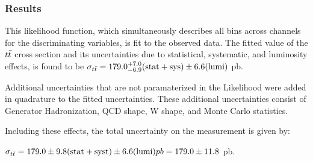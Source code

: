 \subsubsection{Results}

This likelihood function, which simultaneously describes all bins across channels for the discriminating variables, is fit to the observed data.
The fitted value of the $t\bar{t}$ cross section and its uncertainties due to statistical, systematic, and luminosity effects, is found to be $\sigma_{t\bar{t}} = 179.0 ^{+7.0}_{-6.9} \mathrm{(stat+sys)} \pm 6.6 \mathrm{(lumi)} $ pb.

Additional uncertainties that are not paramaterized in the Likelihood were added in quadrature to the fitted uncertainties.
These additional uncertainties consist of Generator Hadronization, QCD shape, W shape, and Monte Carlo statistics.

Including these effects, the total uncertainty on the measurement is given by:

$\sigma_{t\bar{t}} = 179.0 \pm 9.8 \mathrm{(stat + syst)} \pm 6.6 \mathrm{(lumi)} pb = 179.0 \pm 11.8 $ pb.



